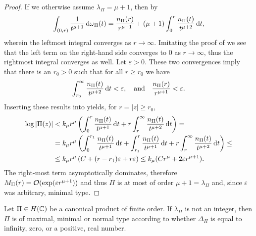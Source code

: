 \begin{proof}
    If we otherwise assume $\lambda_\Pi = \mu + 1$, then by 
    $$ \int_{(0, r)} \frac{1}{t^{\mu + 1}} \mathop{}\!\mathrm{d} \omega_\Pi(t) = \frac{n_\Pi(r)}{r^{\mu + 1}} + (\mu + 1) \int_0^r \frac{n_\Pi(t)}{t^{\mu + 2}} \mathop{}\!\mathrm{d} t, $$
    wherein the leftmost integral converges as $r \to \infty$. Imitating the proof of  we see that the left term on the right-hand side converges to $0$ as $r \to \infty$, thus the rightmost integral converges as well. Let $\varepsilon > 0$. These two convergences imply that there is an $r_0 > 0$ such that for all $r \geq r_0$ we have
    $$ \int_{r_0}^\infty \frac{n_\Pi(t)}{t^{\mu + 2}} \mathop{}\!\mathrm{d} t < \varepsilon, \quad \textrm{and} \quad \frac{n_\Pi(r)}{r^{\mu + 1}} < \varepsilon. $$
    Inserting these results into  yields, for $r = \vert z \vert \geq r_0$,
    \begin{align*}
        \log \vert \Pi(z) \vert &< k_\mu r^\mu \left( \int_0^r \frac{n_\Pi(t)}{t^{\mu + 1}} \mathop{}\!\mathrm{d} t + r \int_r^\infty \frac{n_\Pi(t)}{t^{\mu + 2}} \mathop{}\!\mathrm{d} t \right) = \\
        &= k_\mu r^\mu \left( \int_0^{r_1} \frac{n_\Pi(t)}{t^{\mu + 1}} \mathop{}\!\mathrm{d} t + \int_{r_1}^r \frac{n_\Pi(t)}{t^{\mu + 1}} \mathop{}\!\mathrm{d} t + r \int_r^\infty \frac{n_\Pi(t)}{t^{\mu + 2}} \mathop{}\!\mathrm{d} t \right) \leq \\
        &\leq k_\mu r^\mu \left(C + (r - r_1) \varepsilon + r \varepsilon \right) \leq k_\mu (C r^\mu + 2 \varepsilon r^{\mu + 1}).
    \end{align*}
    The right-most term asymptotically dominates, therefore $M_\Pi(r) = \mathcal{O}(\exp(\varepsilon r^{\mu + 1}))$ and thus $\Pi$ is at most of order $\mu + 1 = \lambda_\Pi$ and, since $\varepsilon$ was arbitrary, minimal type.
\end{proof}


\begin{theorem} \label{thm:canonical-product-type-density}
    Let $\Pi \in H(\mathbb{C})$ be a canonical product of finite order. If $\lambda_\Pi$ is not an integer, then $\Pi$ is of maximal, minimal or normal type according to whether $\Delta_\Pi$ is equal to infinity, zero, or a positive, real number.
\end{theorem}

